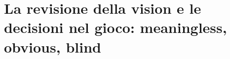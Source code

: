 %
%

\chapter[Vision, must have e decisioni nel gioco]{La revisione della vision
e le decisioni nel gioco: meaningless, obvious, blind}
\label{gd15:cap:decisioni}

